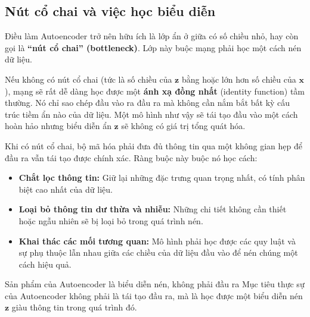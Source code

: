\begin{center}
\label{fig:autoencoder_structure}
\end{center}

\subsection{Nút cổ chai và việc học biểu diễn}
Điều làm Autoencoder trở nên hữu ích là lớp ẩn ở giữa có số chiều nhỏ, hay còn gọi là \textbf{“nút cổ chai” (bottleneck)}. Lớp này buộc mạng phải học một cách nén dữ liệu.

Nếu không có nút cổ chai (tức là số chiều của $\mathbf{z}$ bằng hoặc lớn hơn số chiều của $\mathbf{x}$), mạng sẽ rất dễ dàng học được một \textbf{ánh xạ đồng nhất} (identity function) tầm thường. Nó chỉ sao chép đầu vào ra đầu ra mà không cần nắm bắt bất kỳ cấu trúc tiềm ẩn nào của dữ liệu. Một mô hình như vậy sẽ tái tạo đầu vào một cách hoàn hảo nhưng biểu diễn ẩn $\mathbf{z}$ sẽ không có giá trị tổng quát hóa.

Khi có nút cổ chai, bộ mã hóa phải đưa đủ thông tin qua một không gian hẹp để đầu ra vẫn tái tạo được chính xác. Ràng buộc này buộc nó học cách:
\begin{itemize}
    \item \textbf{Chắt lọc thông tin:} Giữ lại những đặc trưng quan trọng nhất, có tính phân biệt cao nhất của dữ liệu.
    \item \textbf{Loại bỏ thông tin dư thừa và nhiễu:} Những chi tiết không cần thiết hoặc ngẫu nhiên sẽ bị loại bỏ trong quá trình nén.
    \item \textbf{Khai thác các mối tương quan:} Mô hình phải học được các quy luật và sự phụ thuộc lẫn nhau giữa các chiều của dữ liệu đầu vào để nén chúng một cách hiệu quả.
\end{itemize}

\begin{keyidea}{Sản phẩm của Autoencoder là biểu diễn nén, không phải đầu ra}
Mục tiêu thực sự của Autoencoder không phải là tái tạo đầu ra, mà là học được một biểu diễn nén $\mathbf{z}$ giàu thông tin trong quá trình đó.
\end{keyidea}

